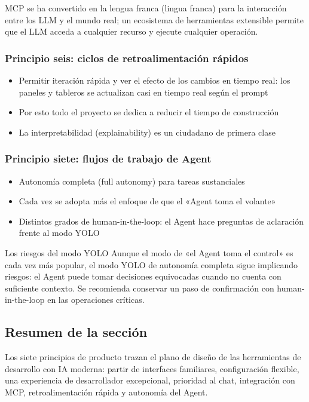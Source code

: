 MCP se ha convertido en la lengua franca (lingua franca) para la interacción entre los LLM y el mundo real; un ecosistema de herramientas extensible permite que el LLM acceda a cualquier recurso y ejecute cualquier operación.

\subsubsection{Principio seis: ciclos de retroalimentación rápidos}

\begin{itemize}
    \item Permitir iteración rápida y ver el efecto de los cambios en tiempo real: los paneles y tableros se actualizan casi en tiempo real según el prompt
    \item Por esto todo el proyecto se dedica a reducir el tiempo de construcción
    \item La interpretabilidad (explainability) es un ciudadano de primera clase
\end{itemize}

\subsubsection{Principio siete: flujos de trabajo de Agent}

\begin{itemize}
    \item Autonomía completa (full autonomy) para tareas sustanciales
    \item Cada vez se adopta más el enfoque de que el «Agent toma el volante»
    \item Distintos grados de human-in-the-loop: el Agent hace preguntas de aclaración frente al modo YOLO
\end{itemize}

\begin{warningbox}{Los riesgos del modo YOLO}
Aunque el modo de «el Agent toma el control» es cada vez más popular, el modo YOLO de autonomía completa sigue implicando riesgos: el Agent puede tomar decisiones equivocadas cuando no cuenta con suficiente contexto. Se recomienda conservar un paso de confirmación con human-in-the-loop en las operaciones críticas.
\end{warningbox}

\subsection{Resumen de la sección}

Los siete principios de producto trazan el plano de diseño de las herramientas de desarrollo con IA moderna: partir de interfaces familiares, configuración flexible, una experiencia de desarrollador excepcional, prioridad al chat, integración con MCP, retroalimentación rápida y autonomía del Agent.


